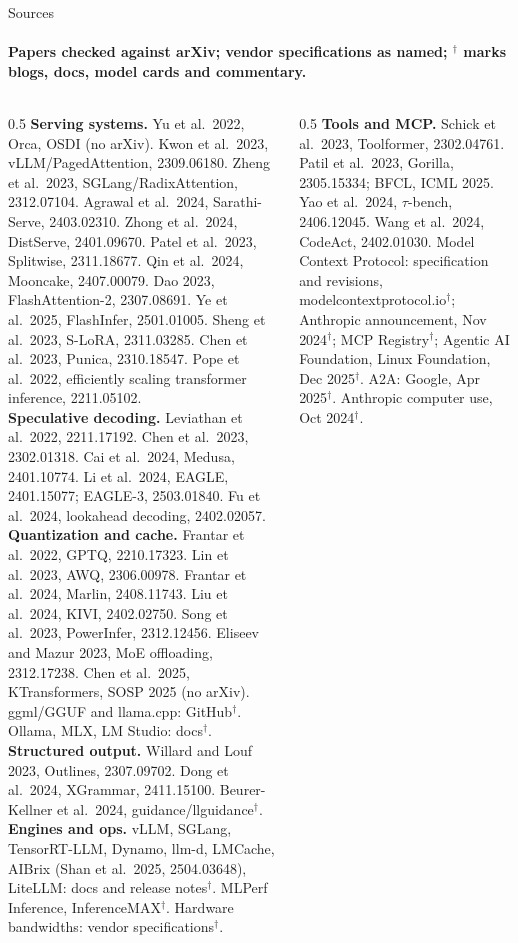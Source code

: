 \documentclass[aspectratio=169,11pt]{beamer}
\begin{document}
\begin{frame}{Sources}
\framesubtitle{Papers checked against arXiv; vendor specifications as named; $^\dagger$ marks blogs, docs, model cards and commentary.}
\begin{columns}[T]
\begin{column}{0.5\textwidth}
\fontsize{5.4}{6.4}\selectfont\color{ink}
\textbf{Serving systems.} Yu et al.\ 2022, Orca, OSDI (no arXiv). Kwon et al.\ 2023, vLLM/PagedAttention, 2309.06180. Zheng et al.\ 2023, SGLang/RadixAttention, 2312.07104. Agrawal et al.\ 2024, Sarathi-Serve, 2403.02310. Zhong et al.\ 2024, DistServe, 2401.09670. Patel et al.\ 2023, Splitwise, 2311.18677. Qin et al.\ 2024, Mooncake, 2407.00079. Dao 2023, FlashAttention-2, 2307.08691. Ye et al.\ 2025, FlashInfer, 2501.01005. Sheng et al.\ 2023, S-LoRA, 2311.03285. Chen et al.\ 2023, Punica, 2310.18547. Pope et al.\ 2022, efficiently scaling transformer inference, 2211.05102.\\[2pt]
\textbf{Speculative decoding.} Leviathan et al.\ 2022, 2211.17192. Chen et al.\ 2023, 2302.01318. Cai et al.\ 2024, Medusa, 2401.10774. Li et al.\ 2024, EAGLE, 2401.15077; EAGLE-3, 2503.01840. Fu et al.\ 2024, lookahead decoding, 2402.02057.\\[2pt]
\textbf{Quantization and cache.} Frantar et al.\ 2022, GPTQ, 2210.17323. Lin et al.\ 2023, AWQ, 2306.00978. Frantar et al.\ 2024, Marlin, 2408.11743. Liu et al.\ 2024, KIVI, 2402.02750. Song et al.\ 2023, PowerInfer, 2312.12456. Eliseev and Mazur 2023, MoE offloading, 2312.17238. Chen et al.\ 2025, KTransformers, SOSP 2025 (no arXiv). ggml/GGUF and llama.cpp: GitHub$^\dagger$. Ollama, MLX, LM Studio: docs$^\dagger$.\\[2pt]
\textbf{Structured output.} Willard and Louf 2023, Outlines, 2307.09702. Dong et al.\ 2024, XGrammar, 2411.15100. Beurer-Kellner et al.\ 2024, guidance/llguidance$^\dagger$.\\[2pt]
\textbf{Engines and ops.} vLLM, SGLang, TensorRT-LLM, Dynamo, llm-d, LMCache, AIBrix (Shan et al.\ 2025, 2504.03648), LiteLLM: docs and release notes$^\dagger$. MLPerf Inference, InferenceMAX$^\dagger$. Hardware bandwidths: vendor specifications$^\dagger$.
\end{column}
\begin{column}{0.5\textwidth}
\fontsize{5.4}{6.4}\selectfont\color{ink}
\textbf{Tools and MCP.} Schick et al.\ 2023, Toolformer, 2302.04761. Patil et al.\ 2023, Gorilla, 2305.15334; BFCL, ICML 2025. Yao et al.\ 2024, $\tau$-bench, 2406.12045. Wang et al.\ 2024, CodeAct, 2402.01030. Model Context Protocol: specification and revisions, modelcontextprotocol.io$^\dagger$; Anthropic announcement, Nov 2024$^\dagger$; MCP Registry$^\dagger$; Agentic AI Foundation, Linux Foundation, Dec 2025$^\dagger$. A2A: Google, Apr 2025$^\dagger$. Anthropic computer use, Oct 2024$^\dagger$.\\[2pt]

\end{column}
\end{columns}
\end{frame}
\end{document}
